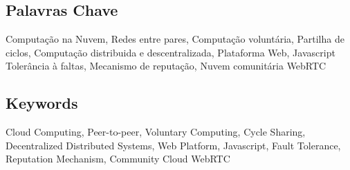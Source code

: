 \newpage
\chapter*{}
\thispagestyle{empty}

\section*{Palavras Chave}
{\large
    \noindent Computa\c{c}\~ao na Nuvem,
    \noindent Redes entre pares,
    \noindent Computação voluntária,
    \noindent Partilha de ciclos,
    \noindent Computa\c{c}\~ao distribuida e descentralizada,
    \noindent Plataforma Web,
    \noindent Javascript
    \noindent Tolerância à faltas,
    \noindent Mecanismo de reputação,
    \noindent Nuvem comunitária
    \noindent WebRTC
}

\section*{Keywords}

{\large
    \noindent Cloud Computing,
    \noindent Peer-to-peer,
    \noindent Voluntary Computing,
    \noindent Cycle Sharing,
    \noindent Decentralized Distributed Systems,
    \noindent Web Platform,
    \noindent Javascript,
    \noindent Fault Tolerance,
    \noindent Reputation Mechanism,
    \noindent Community Cloud
    \noindent WebRTC
}


\cleardoublepage
\pagestyle{plain}
\def\contentsname{Index}
\tableofcontents
\newpage
\listoffigures
\newpage
\listoftables
\cleardoublepage
